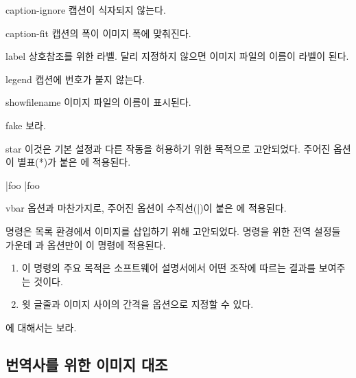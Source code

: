 \documentclass[pairquote, minted]{hzguide}
\begin{document}
\begin{macros}
\item[caption-ignore] \keyvalueTF
캡션이 식자되지 않는다.

\item[caption-fit] \keyvalueTF
캡션의 폭이 이미지 폭에 맞춰진다.

\item[label] 
상호참조를 위한 라벨. 달리 지정하지 않으면 이미지 파일의 이름이 라벨이 된다.

\item[legend] \keyvalueTF
캡션에 번호가 붙지 않는다.

\item[showfilename] \keyvalueTF
이미지 파일의 이름이 표시된다.

\item[fake] \keyvalueTF
{}\를 보라.

\item[star] 
이것은 기본 설정과 다른 작동을 허용하기 위한 목적으로 고안되었다.
주어진 옵션이 별표(*)가 붙은 \macro{\image*}에 적용된다. 

\begin{code}
  \image|{foo} \image*|{foo}
\end{code}

\item[vbar] 
 옵션과 마찬가지로, 주어진 옵션이 수직선(|)이 붙은 \macro{\image|}에 적용된다. 
\end{macros}

\macro{\listimg} 명령은 목록 환경에서 이미지를 삽입하기 위해 고안되었다. \macro{\image} 명령을 위한 전역 설정들 가운데 과  옵션만이 이 명령에 적용된다.

\begin{coderesult}
\begin{enumerate}
\item 이 명령의 주요 목적은 소프트웨어 설명서에서 어떤 조작에 따르는 결과를 보여주는 것이다.
\item 윗 글줄과 이미지 사이의 간격을 옵션으로 지정할 수 있다.
\end{enumerate}
\end{coderesult}

\macro{\listimg*}에 대해서는 \를 보라.

\subsection{번역사를 위한 이미지 대조}
\end{document}
